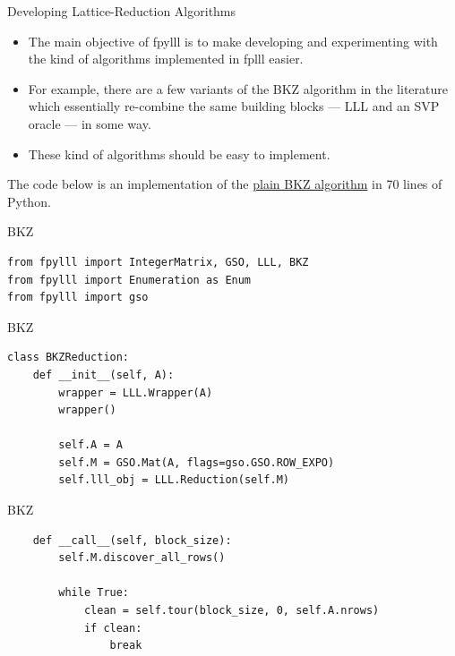 \documentclass[presentation,smaller]{beamer}
\begin{document}
\begin{frame}[label={sec:orgheadline15}]{Developing Lattice-Reduction Algorithms}
\begin{itemize}
\item The main objective of \alert{fpylll} is to make developing and experimenting with the kind of algorithms implemented in \alert{fplll} easier.
\item For example, there are a few variants of the BKZ algorithm in the literature which essentially re-combine the same building blocks — LLL and an SVP oracle — in some way.
\item These kind of algorithms should be easy to implement.
\end{itemize}

The code below is an implementation of the \href{https://github.com/malb/fpylll/blob/master/src/fpylll/contrib/simple_bkz.py}{plain BKZ algorithm} in 70 lines of Python.
\end{frame}

\begin{frame}[fragile,label={sec:orgheadline16}]{BKZ}
 \lstset{language=Python,label= ,caption= ,captionpos=b,numbers=none}
\begin{lstlisting}
from fpylll import IntegerMatrix, GSO, LLL, BKZ
from fpylll import Enumeration as Enum
from fpylll import gso
\end{lstlisting}
\end{frame}

\begin{frame}[fragile,label={sec:orgheadline17}]{BKZ}
 \lstset{language=Python,label= ,caption= ,captionpos=b,numbers=none}
\begin{lstlisting}
class BKZReduction:
    def __init__(self, A):
        wrapper = LLL.Wrapper(A)
        wrapper()

        self.A = A
        self.M = GSO.Mat(A, flags=gso.GSO.ROW_EXPO)
        self.lll_obj = LLL.Reduction(self.M)
\end{lstlisting}
\end{frame}

\begin{frame}[fragile,label={sec:orgheadline18}]{BKZ}
 \lstset{language=Python,label= ,caption= ,captionpos=b,numbers=none}
\begin{lstlisting}
    def __call__(self, block_size):
        self.M.discover_all_rows()

        while True:
            clean = self.tour(block_size, 0, self.A.nrows)
            if clean:
                break
\end{lstlisting}
\end{frame}
\end{document}
